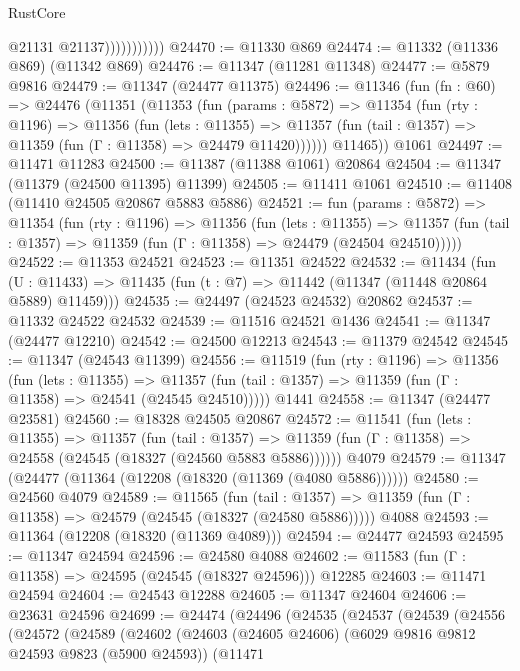 \begin{lexlean}{RustCore}
\begin{coremodule}
                          @21131
                          @21137)))))))))))
@24470 := @11330 @869
@24474 := @11332 (@11336 @869) (@11342 @869)
@24476 := @11347 (@11281 @11348)
@24477 := @5879 @9816
@24479 := @11347 (@24477 @11375)
@24496 := @11346
    (fun (fn : @60) =>
    @24476
      (@11351
        (@11353
          (fun (params : @5872) =>
          @11354
            (fun (rty : @1196) =>
            @11356
              (fun (lets : @11355) =>
              @11357 (fun (tail : @1357) => @11359 (fun (Γ : @11358) => @24479 @11420))))))
        @11465))
    @1061
@24497 := @11471 @11283
@24500 := @11387 (@11388 @1061) @20864
@24504 := @11347 (@11379 (@24500 @11395) @11399)
@24505 := @11411 @1061
@24510 := @11408 (@11410 @24505 @20867 @5883 @5886)
@24521 := fun (params : @5872) =>
  @11354
    (fun (rty : @1196) =>
    @11356
      (fun (lets : @11355) =>
      @11357 (fun (tail : @1357) => @11359 (fun (Γ : @11358) => @24479 (@24504 @24510)))))
@24522 := @11353 @24521
@24523 := @11351 @24522
@24532 := @11434
    (fun (U : @11433) => @11435 (fun (t : @7) => @11442 (@11347 (@11448 @20864 @5889) @11459)))
@24535 := @24497 (@24523 @24532) @20862
@24537 := @11332 @24522 @24532
@24539 := @11516 @24521 @1436
@24541 := @11347 (@24477 @12210)
@24542 := @24500 @12213
@24543 := @11379 @24542
@24545 := @11347 (@24543 @11399)
@24556 := @11519
    (fun (rty : @1196) =>
    @11356
      (fun (lets : @11355) =>
      @11357 (fun (tail : @1357) => @11359 (fun (Γ : @11358) => @24541 (@24545 @24510)))))
    @1441
@24558 := @11347 (@24477 @23581)
@24560 := @18328 @24505 @20867
@24572 := @11541
    (fun (lets : @11355) =>
    @11357
      (fun (tail : @1357) =>
      @11359 (fun (Γ : @11358) => @24558 (@24545 (@18327 (@24560 @5883 @5886))))))
    @4079
@24579 := @11347 (@24477 (@11364 (@12208 (@18320 (@11369 (@4080 @5886))))))
@24580 := @24560 @4079
@24589 := @11565
    (fun (tail : @1357) => @11359 (fun (Γ : @11358) => @24579 (@24545 (@18327 (@24580 @5886)))))
    @4088
@24593 := @11364 (@12208 (@18320 (@11369 @4089)))
@24594 := @24477 @24593
@24595 := @11347 @24594
@24596 := @24580 @4088
@24602 := @11583 (fun (Γ : @11358) => @24595 (@24545 (@18327 @24596))) @12285
@24603 := @11471 @24594
@24604 := @24543 @12288
@24605 := @11347 @24604
@24606 := @23631 @24596
@24699 := @24474
    (@24496
      (@24535
        (@24537
          (@24539
            (@24556
              (@24572
                (@24589
                  (@24602
                    (@24603
                      (@24605 @24606)
                      (@6029 @9816 @9812 @24593 @9823 (@5900 @24593))
                      (@11471

\end{coremodule}
\end{lexlean}
